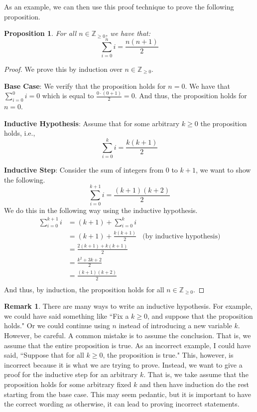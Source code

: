 \documentclass{article}
\newcommand{\ZZ}{\mathbb{Z}_{\geq 0}}
\theoremstyle{plain}
\newtheorem{proposition}{Proposition}
\theoremstyle{definition}
\newtheorem{remark}{Remark}
\begin{document}
As an example, we can then use this proof technique to prove the following proposition.

\begin{proposition}\label{prop1}
    For all \(n \in \ZZ\), we have that:
    \[\sum_{i=0}^n i = \frac{n(n+1)}{2}\]
\end{proposition}
\begin{proof}
    We prove this by induction over \(n \in \ZZ\).
    
    \textbf{Base Case}: We verify that the proposition holds for \(n=0\). We have that \(\sum_{i=0}^0 i = 0\) which is equal to \(\frac{0 \cdot (0 + 1)}{2} = 0\). And thus, the proposition holds for \(n=0\).

    \textbf{Inductive Hypothesis}: Assume that for some arbitrary \(k \geq 0\) the proposition holds, i.e.,
    \[\sum_{i=0}^k i = \frac{k(k+1)}{2}\]

    \textbf{Inductive Step}: Consider the sum of integers from \(0\) to \(k+1\), we want to show the following.
    \[\sum_{i=0}^{k+1} i = \frac{(k+1)(k+2)}{2}\]
    We do this in the following way using the inductive hypothesis.
    \begin{align*}
        \sum_{i=0}^{k+1} i &= (k+1) + \sum_{i = 0}^{k} i \\
        &= (k+1) + \frac{k(k+1)}{2}\ \ \ \ \text{(by inductive hypothesis)} \\
        &= \frac{2(k+1) + k(k+1)}{2} \\
        &= \frac{k^2 + 3k + 2}{2} \\ 
        &= \frac{(k+1)(k+2)}{2} \\ 
    \end{align*}
    And thus, by induction, the proposition holds for all \(n \in \ZZ\).
\end{proof}

\begin{remark}
    There are many ways to write an inductive hypothesis. For example, we could have said something like ``Fix a \(k \geq 0\), and suppose that the proposition holds." Or we could continue using \(n\) instead of introducing a new variable \(k\). However, be careful. A common mistake is to assume the conclusion. That is, we assume that the entire proposition is true. As an incorrect example, I could have said, ``Suppose that for all \(k \geq 0\), the proposition is true." This, however, is incorrect because it is what we are trying to prove. Instead, we want to give a proof for the inductive step for an arbitrary \(k\). That is, we take assume that the proposition holds for some arbitrary fixed \(k\) and then have induction do the rest starting from the base case. This may seem pedantic, but it is important to have the correct wording as otherwise, it can lead to proving incorrect statements.
\end{remark}
\end{document}
